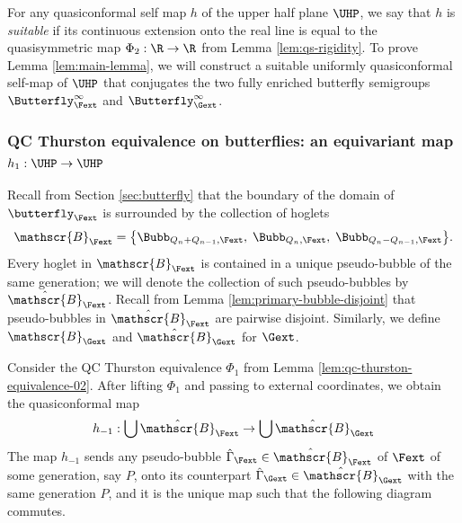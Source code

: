 \documentclass{amsart}
\begin{document}
For any quasiconformal self map $h$ of the upper half plane $\UHP$, we say that $h$ is \emph{suitable} if its continuous extension onto the real line is equal to the quasisymmetric map $\Phi_2: \R \to \R$ from Lemma \ref{lem:qs-rigidity}.
To prove Lemma \ref{lem:main-lemma}, we will construct a suitable uniformly quasiconformal self-map of $\UHP$ that conjugates the two fully enriched butterfly semigroups $\Butterfly_{\Fext}^\infty$ and $\Butterfly_{\Gext}^\infty$.

\subsubsection{QC Thurston equivalence on butterflies: an equivariant map $h_1 : \UHP \to \UHP$}\label{ss:QC.Th.eq.batt}
Recall from Section \ref{sec:butterfly} that the boundary of the domain of $\butterfly_{\Fext}$ is surrounded by the collection of hoglets
\[
    \mathscr{B}_{\Fext} = 
        \big\{
        \Bubb_{Q_n+Q_{n-1}, \Fext}, \; \Bubb_{Q_{n},\Fext}, \; \Bubb_{Q_n-Q_{n-1},\Fext}
        \big\}.
\]
Every hoglet in $\mathscr{B}_{\Fext}$ is contained in a unique pseudo-bubble of the same generation; we will denote the collection of such pseudo-bubbles by $\hat{\mathscr{B}}_{\Fext}$. 
Recall from Lemma \ref{lem:primary-bubble-disjoint} that pseudo-bubbles in $\hat{\mathscr{B}}_{\Fext}$ are pairwise disjoint.
Similarly, we define $\mathscr{B}_{\Gext}$ and $\hat{\mathscr{B}}_{\Gext}$ for $\Gext$.

Consider the QC Thurston equivalence $\Phi_1$ from Lemma \ref{lem:qc-thurston-equivalence-02}. 
After lifting $\Phi_1$ and passing to external coordinates, we obtain the quasiconformal map 
\[
    h_{-1} : \bigcup \hat{\mathscr{B}}_{\Fext} \to \bigcup \hat{\mathscr{B}}_{\Gext}
\]
The map $h_{-1}$ sends any pseudo-bubble $\hat{\Gamma}_{\Fext} \in \hat{\mathscr{B}}_{\Fext}$ of $\Fext$ of some generation, say $P$, onto its counterpart $\hat{\Gamma}_{\Gext} \in \hat{\mathscr{B}}_{\Gext}$ with the same generation $P$, and it is the unique map such that the following diagram commutes.
\begin{center}
\end{center}
\end{document}
